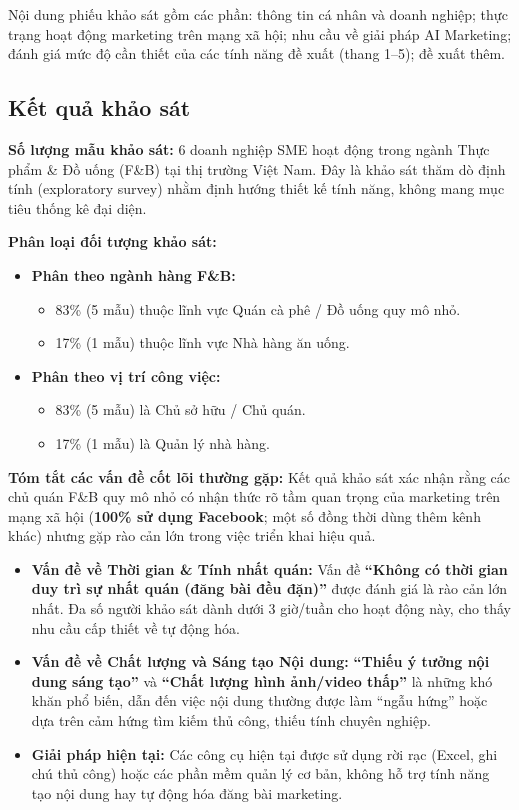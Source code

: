 Nội dung phiếu khảo sát gồm các phần: thông tin cá nhân và doanh nghiệp;
thực trạng hoạt động marketing trên mạng xã hội; nhu cầu về giải pháp
AI Marketing; đánh giá mức độ cần thiết của các tính năng đề xuất (thang
1--5); đề xuất thêm.

\subsection{Kết quả khảo sát}

\textbf{Số lượng mẫu khảo sát:} 6 doanh nghiệp SME hoạt động trong ngành
Thực phẩm \& Đồ uống (F\&B) tại thị trường Việt Nam. Đây là khảo sát
thăm dò định tính (exploratory survey) nhằm định hướng thiết kế tính năng,
không mang mục tiêu thống kê đại diện.

\textbf{Phân loại đối tượng khảo sát:}

\begin{itemize}
\item
  \textbf{Phân theo ngành hàng F\&B:}

  \begin{itemize}
  \item
    83\% (5 mẫu) thuộc lĩnh vực Quán cà phê / Đồ uống quy mô nhỏ.
  \item
    17\% (1 mẫu) thuộc lĩnh vực Nhà hàng ăn uống.
  \end{itemize}
\item
  \textbf{Phân theo vị trí công việc:}

  \begin{itemize}
  \item
    83\% (5 mẫu) là Chủ sở hữu / Chủ quán.
  \item
    17\% (1 mẫu) là Quản lý nhà hàng.
  \end{itemize}
\end{itemize}

\textbf{Tóm tắt các vấn đề cốt lõi thường gặp:}
Kết quả khảo sát xác nhận rằng các chủ quán F\&B quy mô nhỏ có nhận thức
rõ tầm quan trọng của marketing trên mạng xã hội (\textbf{100\% sử dụng
Facebook}; một số đồng thời dùng thêm kênh khác) nhưng gặp rào cản lớn
trong việc triển khai hiệu quả.

\begin{itemize}
\item
  \textbf{Vấn đề về Thời gian \& Tính nhất quán:} Vấn đề \textbf{``Không
  có thời gian duy trì sự nhất quán (đăng bài đều đặn)''} được đánh giá
  là rào cản lớn nhất. Đa số người khảo sát dành dưới 3 giờ/tuần cho
  hoạt động này, cho thấy nhu cầu cấp thiết về tự động hóa.
\item
  \textbf{Vấn đề về Chất lượng và Sáng tạo Nội dung:} \textbf{``Thiếu ý
  tưởng nội dung sáng tạo''} và \textbf{``Chất lượng hình ảnh/video thấp''}
  là những khó khăn phổ biến, dẫn đến việc nội dung thường được làm
  ``ngẫu hứng'' hoặc dựa trên cảm hứng tìm kiếm thủ công, thiếu tính
  chuyên nghiệp.
\item
  \textbf{Giải pháp hiện tại:} Các công cụ hiện tại được sử dụng rời rạc
  (Excel, ghi chú thủ công) hoặc các phần mềm quản lý cơ bản, không hỗ
  trợ tính năng tạo nội dung hay tự động hóa đăng bài marketing.
\end{itemize}

